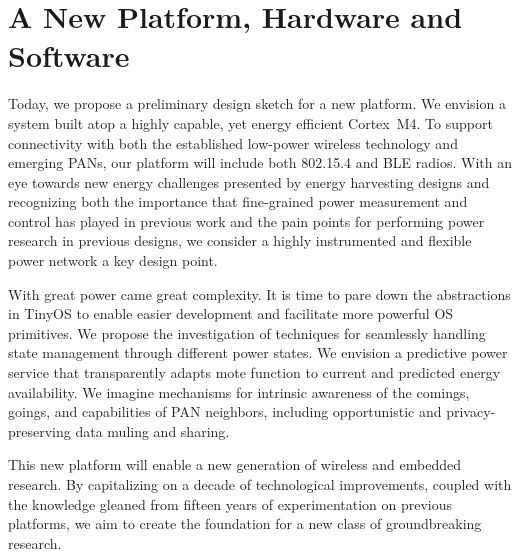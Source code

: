 \section{A New Platform, Hardware and Software}

Today, we propose a preliminary design sketch for a new platform. We envision
a system built atop a highly capable, yet energy efficient Cortex~M4. To
support connectivity with both the established low-power wireless technology
and emerging PANs, our platform will include both 802.15.4 and BLE radios.
With an eye towards new energy challenges presented by energy harvesting
designs and recognizing both the importance that fine-grained power
measurement and control has played in previous work and the pain points for
performing power research in previous designs, we consider a highly
instrumented and flexible power network a key design point.

With great power came great complexity. It is time to pare down the
abstractions in TinyOS to enable easier development and facilitate more
powerful OS primitives.
We propose the investigation of techniques for seamlessly handling state
management through different power states. We envision a predictive power
service that transparently adapts mote function to current and predicted
energy availability. We imagine mechanisms for intrinsic awareness of the
comings, goings, and capabilities of PAN neighbors, including opportunistic
and privacy-preserving data muling and sharing.


This new platform will enable a new generation of wireless and embedded
research. By capitalizing on a decade of technological improvements, coupled
with the knowledge gleaned from fifteen years of experimentation on previous
platforms, we aim to create the foundation for a new class of groundbreaking
research.



